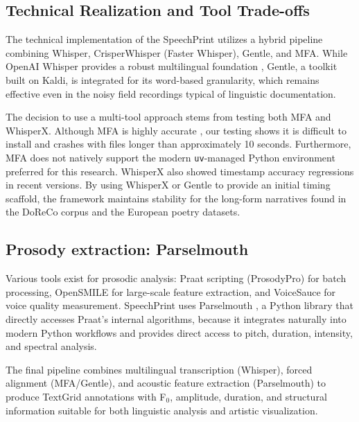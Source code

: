 \subsection{Technical Realization and Tool Trade-offs}

The technical implementation of the SpeechPrint utilizes a hybrid pipeline combining Whisper, CrisperWhisper (Faster Whisper), Gentle, and MFA. While OpenAI Whisper provides a robust multilingual foundation \cite{radford2023whisper}, Gentle, a toolkit built on Kaldi, is integrated for its word-based granularity, which remains effective even in the noisy field recordings typical of linguistic documentation.

The decision to use a multi-tool approach stems from testing both MFA and WhisperX. Although MFA is highly accurate \cite{mcauliffe2017mfa}, our testing shows it is difficult to install and crashes with files longer than approximately 10 seconds. Furthermore, MFA does not natively support the modern \texttt{uv}-managed Python environment preferred for this research. WhisperX also showed timestamp accuracy regressions in recent versions. By using WhisperX \cite{bain2023whisperx} or Gentle to provide an initial timing scaffold, the framework maintains stability for the long-form narratives found in the DoReCo corpus and the European poetry datasets.

\subsection{Prosody extraction: Parselmouth}

Various tools exist for prosodic analysis: Praat scripting (ProsodyPro) for batch processing, OpenSMILE for large-scale feature extraction, and VoiceSauce for voice quality measurement. SpeechPrint uses Parselmouth \cite{Jadoul2018}, a Python library that directly accesses Praat's internal algorithms, because it integrates naturally into modern Python workflows and provides direct access to pitch, duration, intensity, and spectral analysis.

The final pipeline combines multilingual transcription (Whisper), forced alignment (MFA/Gentle), and acoustic feature extraction (Parselmouth) to produce TextGrid annotations with F$_0$, amplitude, duration, and structural information suitable for both linguistic analysis and artistic visualization.

